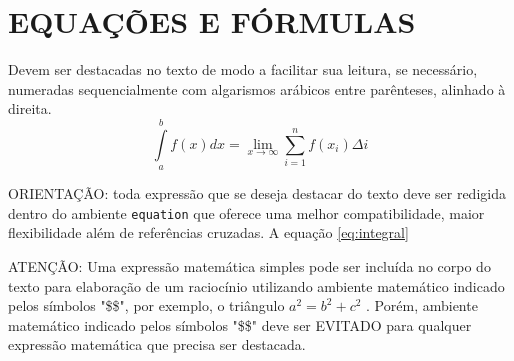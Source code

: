 
\section{EQUAÇÕES E FÓRMULAS}

Devem ser destacadas no texto de modo a facilitar sua leitura, se necessário, numeradas sequencialmente com algarismos arábicos entre parênteses, alinhado à direita. 
\begin{equation}
	\label{eq:integral}
	\int\limits_a^b f(x) dx = \lim_{x \to \infty} \displaystyle\sum_{i=1}^{n} f(x_i) \Delta i
\end{equation}        

ORIENTAÇÃO: toda expressão que se deseja destacar do texto deve ser redigida dentro do ambiente \verb|equation| que oferece uma melhor compatibilidade, maior flexibilidade além de referências cruzadas. A equação \ref{eq:integral}  

ATENÇÃO: Uma expressão matemática simples pode ser incluída no corpo do texto para elaboração de um raciocínio utilizando  ambiente matemático indicado pelos símbolos "\$\$", por exemplo,  o triângulo $a^2 = b^2 + c^2$ . Porém,  ambiente matemático indicado pelos símbolos "\$\$" deve ser EVITADO para qualquer expressão matemática que precisa ser destacada.

